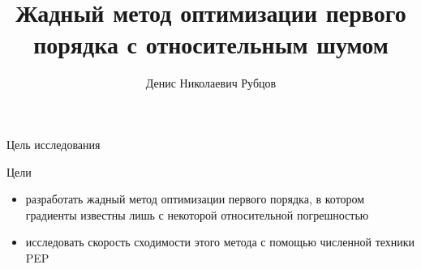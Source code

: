 \documentclass{beamer}
\title[\hbox to 56mm{Жадный метод оптимизации первого порядка с относительным шумом}]{Жадный метод оптимизации первого порядка с относительным шумом}
\author[Д.\,Н. Рубцов]{Денис Николаевич Рубцов}
\institute{Московский физико-технический институт}
\date{\footnotesize
\par\smallskip\emph{Курс:} Автоматизация научных исследований\par (практика, В.\,В.~Стрижов)/Группа 105
\par\smallskip\emph{Эксперт:} к.ф.-м.н. Э.\,А.~Горбунов
\par\smallskip\emph{Консультант:} Н.\,М.~Корнилов
\par\bigskip\small 2024}
\begin{document}
\begin{frame}
\thispagestyle{empty}
\maketitle
\end{frame}
\begin{frame}{Цель исследования}
     \begin{block}{Цели}
     \begin{itemize}
         \item разработать жадный метод оптимизации первого порядка, в котором градиенты известны лишь с некоторой относительной погрешностью
         \item исследовать скорость сходимости этого метода с помощью численной техники PEP
     \end{itemize}
     \end{block}

 \end{frame}
\end{document}
